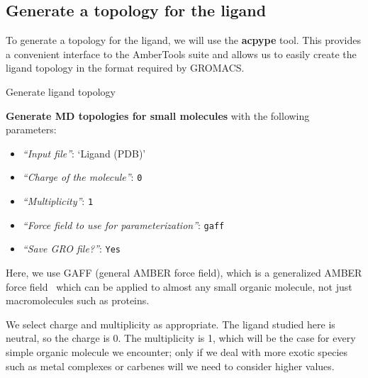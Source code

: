 \documentclass[twocolumn]{bmcart}%
\providecommand{\tightlist}{%
  \setlength{\itemsep}{0pt}\setlength{\parskip}{0pt}}
\begin{document}
\subsection*{Generate a topology for the
ligand}\label{generate-a-topology-for-the-ligand}

To generate a topology for the ligand, we will use the \textbf{acpype}
tool. This provides a convenient interface to the AmberTools suite and
allows us to easily create the ligand topology in the format required by
GROMACS.

\begin{handson_box_colour}{Generate ligand topology}

  \textbf{Generate MD topologies for small molecules} with the following
  parameters:

  \begin{itemize}
  \tightlist
  \item
    \emph{``Input file''}: `Ligand (PDB)'
  \item
    \emph{``Charge of the molecule''}: \texttt{0}
  \item
    \emph{``Multiplicity''}: \texttt{1}
  \item
    \emph{``Force field to use for parameterization''}:
    \texttt{gaff}
  \item
    \emph{``Save GRO file?''}: \texttt{Yes}
  \end{itemize}

\end{handson_box_colour}

Here, we use GAFF (general AMBER force field), which is a generalized AMBER force field~\cite{Wang2004} which can be applied to almost any small organic molecule, not just macromolecules such as proteins.

We select charge and multiplicity as appropriate. The ligand studied here is neutral, so the charge is 0. The multiplicity is 1, which will be the case for every simple organic molecule we encounter; only if we deal with more exotic species such as metal complexes or carbenes will we need to consider higher values.

\end{document}
